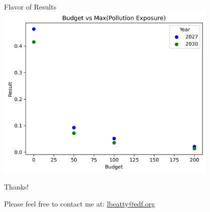 \documentclass{beamer}
\begin{document}
\begin{frame}{Flavor of Results}
    \centering
    \includegraphics[width=0.8\textwidth]{Figures/EndogenousResults/current_policies_short_simplified/exposure_cost_PPF.png}
\end{frame}

\begin{frame}{Thanks!}
\label{Thanks}


    Please feel free to contact me at:
    \href{mailto:lbeatty@edf.org}{lbeatty@edf.org}\\
    \vspace{1cm}
\end{frame}
\end{document}
